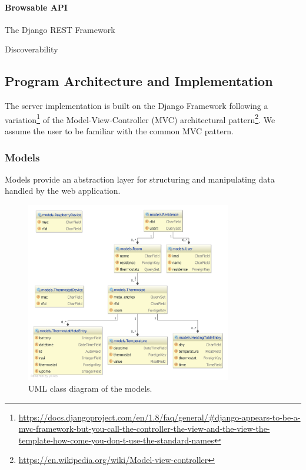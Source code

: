 \paragraph{Browsable API}

The Django REST Framework 

Discoverability



\subsection{Program Architecture and Implementation}

The server implementation is built on the Django Framework following a variation\footnote{\url{https://docs.djangoproject.com/en/1.8/faq/general/\#django-appears-to-be-a-mvc-framework-but-you-call-the-controller-the-view-and-the-view-the-template-how-come-you-don-t-use-the-standard-names}} of the Model-View-Controller (MVC) architectural pattern\footnote{\url{https://en.wikipedia.org/wiki/Model-view-controller}}. We assume the user to be familiar with the common MVC pattern.

\subsubsection{Models}

Models provide an abstraction layer for structuring and manipulating data handled by the web application.

\begin{figure}[h]
\begin{center}
\includegraphics[width=0.8\textwidth]{images/uml_class_diagram_pycharm_highres.png}
\end{center}
\caption{UML class diagram of the models.}
\label{fig:class_diagram}
\end{figure}

